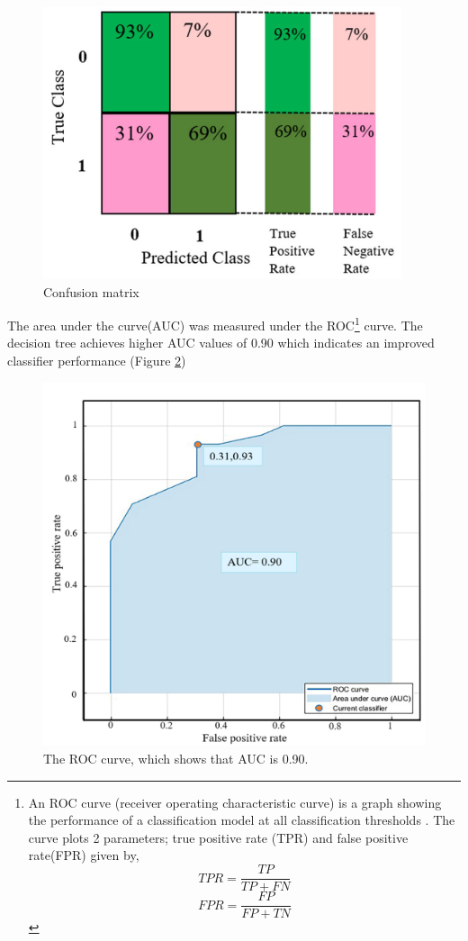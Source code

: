 \begin{figure}
    \centering
    \includegraphics[scale=0.3]{chapters/images/conf_mtx_measured.png}
    \caption{Confusion matrix}
    \label{fig:conf_mtx_m}
\end{figure}

The area under the curve(AUC) was measured under the ROC\footnote{An ROC curve (receiver operating characteristic curve) is a graph showing the performance of a classification model at all classification thresholds \cite{roc}. The curve plots 2 parameters; true positive rate (TPR) and false positive rate(FPR) given by,  $$TPR = \frac{TP}{TP+FN}$$ $$FPR = \frac{FP}{FP+TN}$$} curve. The decision tree achieves higher AUC values of 0.90 which indicates an improved classifier performance (Figure \ref{fig:roc})

\begin{figure}
    \centering
    \includegraphics[scale=0.3]{chapters/images/roc.png}
    \caption{The ROC curve, which shows that AUC is 0.90. \cite{alawad_learning_2020}}
    \label{fig:roc}
\end{figure}

